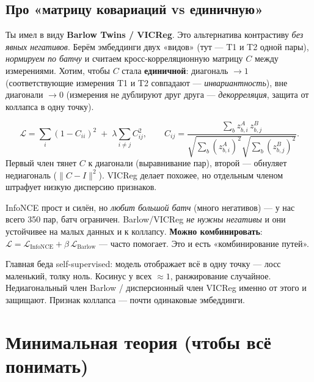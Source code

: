 \documentclass[11pt,a4paper]{article}
\begin{document}
\subsection{Про «матрицу ковариаций vs единичную»}

Ты имел в виду \textbf{Barlow Twins / VICReg}. Это альтернатива контрастиву \emph{без явных
негативов}. Берём эмбеддинги двух «видов» (тут — T1 и T2 одной пары), \emph{нормируем по батчу}
и считаем кросс-корреляционную матрицу $C$ между измерениями. Хотим, чтобы $C$ стала
\textbf{единичной}: диагональ $\to 1$ (соответствующие измерения T1 и T2 совпадают —
\emph{инвариантность}), вне диагонали $\to 0$ (измерения не дублируют друг друга —
\emph{декорреляция}, защита от коллапса в одну точку).

\begin{mathidea}
\[
\mathcal{L}=\sum_i (1-C_{ii})^2 \;+\; \lambda \sum_{i\neq j} C_{ij}^2,
\qquad
C_{ij}=\frac{\sum_b z^{A}_{b,i}\,z^{B}_{b,j}}{\sqrt{\sum_b (z^A_{b,i})^2}\sqrt{\sum_b (z^B_{b,j})^2}}.
\]
Первый член тянет $C$ к диагонали (выравнивание пар), второй — обнуляет недиагональ
($\|C-I\|^2$). VICReg делает похожее, но отдельным членом штрафует низкую дисперсию признаков.
\end{mathidea}

\begin{tradeoff}
InfoNCE прост и силён, но \emph{любит большой батч} (много негативов) — у нас всего 350 пар,
батч ограничен. Barlow/VICReg \emph{не нужны негативы} и они устойчивее на малых данных и к
коллапсу. \textbf{Можно комбинировать}: $\mathcal{L}=\mathcal{L}_{\text{InfoNCE}}+\beta\,\mathcal{L}_{\text{Barlow}}$ —
часто помогает. Это и есть «комбинирование путей».
\end{tradeoff}

\begin{failure}
Главная беда self-supervised: модель отображает всё в одну точку — лосс маленький, толку ноль.
Косинус у всех $\approx 1$, ранжирование случайное. Недиагональный член Barlow / дисперсионный
член VICReg именно от этого и защищают. Признак коллапса — почти одинаковые эмбеддинги.
\end{failure}

\section{Минимальная теория (чтобы всё понимать)}
\end{document}
